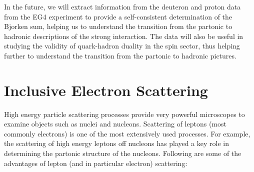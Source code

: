 In the future, we will extract information %
from the %
deuteron and proton data from the EG4 experiment to %
provide a self-consistent determination %
of the Bjorken sum, %
helping us to understand the transition from the partonic to hadronic descriptions of the strong interaction. The data will also be useful in studying the validity of %
quark-hadron duality in the spin sector, thus helping further to understand the transition from the partonic to hadronic pictures. %




\section{Inclusive Electron Scattering}
\label{inclScatKineVars}%
High energy particle scattering processes %
provide very powerful microscopes to examine %
objects such as nuclei and nucleons. %
Scattering of leptons (most commonly electrons) is one of the most extensively used processes. For example, the scattering of high energy leptons off nucleons has played a key role in determining the partonic structure of the nucleons. Following are some of the advantages of lepton (and in particular electron) scattering: %


